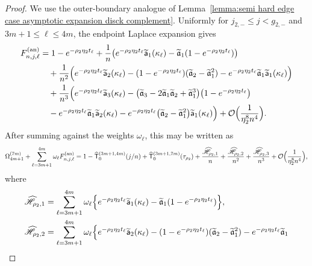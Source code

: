 \documentclass[a4paper]{article}
\numberwithin{equation}{section}
\begin{document}
\begin{proof}
We use the outer-boundary analogue of
Lemma~\ref{lemma:semi hard edge case asymptotic expansion disck complement}.
Uniformly for $j_{2,-}\le j<g_{2,-}$ and
$3m+1\le\ell\le4m$, the endpoint Laplace expansion gives
\begin{align*}
F_{n,j,\ell}^{(\mathrm{an})}
&=
1-e^{-\rho_2\eta_2t_{\ell}}+\frac{1}{n}
\bigl(
e^{-\rho_2\eta_2t_{\ell}}
\widetilde{\mathsf{a}}_{1}(\kappa_{\ell})
-\widetilde{\mathfrak{a}}_1(1-e^{-\rho_2\eta_2t_{\ell}})
\bigr)
\\
&\quad 
+\frac{1}{n^2}\Bigl(
e^{-\rho_2\eta_2t_{\ell}}
\widetilde{\mathsf{a}}_{2}(\kappa_{\ell})
-(1-e^{-\rho_2\eta_2t_{\ell}})(\widetilde{\mathfrak{a}}_2-\widetilde{\mathfrak{a}}_1^2)
-e^{-\rho_2\eta_2t_{\ell}}\widetilde{\mathfrak{a}}_1
\widetilde{\mathsf{a}}_{1}(\kappa_{\ell})
\Bigr)
\\
&\quad 
+\frac{1}{n^3}\Bigl(
e^{-\rho_2\eta_2t_{\ell}}
\widetilde{\mathsf{a}}_{3}(\kappa_{\ell})
-\bigl( 
\widetilde{\mathfrak{a}}_3-2\widetilde{\mathfrak{a}}_1\widetilde{\mathfrak{a}}_2+\widetilde{\mathfrak{a}}_1^3
\bigr)\bigl(1-e^{-\rho_2\eta_2t_{\ell}}\bigr)
\\
&\quad 
-e^{-\rho_2\eta_2t_{\ell}}
\widetilde{\mathfrak{a}}_1
\widetilde{\mathsf{a}}_{2}(\kappa_{\ell})
-e^{-\rho_2\eta_2t_{\ell}}\bigl(\widetilde{\mathfrak{a}}_2-\widetilde{\mathfrak{a}}_1^2\bigr)
\widetilde{\mathsf{a}}_{1}(\kappa_{\ell})
\Bigr)
+\mathcal{O}\Bigl(\frac{1}{\eta_2^8n^4}\Bigr). 
\end{align*}
After summing against the weights $\omega_\ell$, this may be written as
\[
\Omega_{4m+1}^{(7m)}+\sum_{\ell=3m+1}^{4m}\omega_{\ell}F_{n,j,\ell}^{(\mathrm{an})}
=
1-\widehat{\mathsf{T}}_0^{(3m+1,4m)}(j/n)+\widehat{\mathsf{T}}_0^{(3m+1,7m)}(\tau_{\rho_2})
+
\frac{\widehat{\mathscr{H}}_{\rho_2,1}}{n}
+
\frac{\widehat{\mathscr{H}}_{\rho_2,2}}{n^2}
+
\frac{\widehat{\mathscr{H}}_{\rho_2,3}}{n^3}
+
\mathcal{O}\Bigl(\frac{1}{\eta_2^8n^4}\Bigr), 
\]
where 
\begin{align*}
\widehat{\mathscr{H}}_{\rho_2,1}
&=
\sum_{\ell=3m+1}^{4m}\omega_{\ell}
\Bigl\{
e^{-\rho_2\eta_2t_{\ell}}
\widetilde{\mathsf{a}}_{1}(\kappa_{\ell})
-\widetilde{\mathfrak{a}}_1(1-e^{-\rho_2\eta_2t_{\ell}})
\Bigr\}, 
\\
\widehat{\mathscr{H}}_{\rho_2,2}
&=
\sum_{\ell=3m+1}^{4m}\omega_{\ell}
\Bigl\{
e^{-\rho_2\eta_2t_{\ell}}
\widetilde{\mathsf{a}}_{2}(\kappa_{\ell})
-(1-e^{-\rho_2\eta_2t_{\ell}})(\widetilde{\mathfrak{a}}_2-\widetilde{\mathfrak{a}}_1^2)
-e^{-\rho_2\eta_2t_{\ell}}\widetilde{\mathfrak{a}}_1 

\end{align*}
\end{proof}
\end{document}
